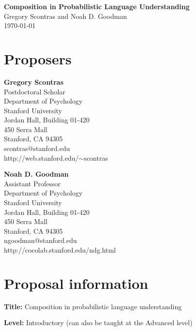 \documentclass[11pt]{article}
\begin{document}
\thispagestyle{plain}

\begin{center}
	
	{\huge \textbf{Composition in Probabilistic Language Understanding}}\\[10pt]
	
	{\Large Gregory Scontras and Noah D. Goodman \\[10pt]
	
	\today}
\end{center}

\section{Proposers}

\begin{minipage}{.5\linewidth}
	\textbf{Gregory Scontras}\\
	Postdoctoral Scholar\\
	Department of Psychology\\
	Stanford University\\
	Jordan Hall, Building 01-420\\
	450 Serra Mall\\
	Stanford, CA 94305\\
	scontras$@$stanford.edu\\
	http://web.stanford.edu/$\sim$scontras
\end{minipage}
\begin{minipage}{.5\linewidth}
	\textbf{Noah D. Goodman}\\
	Assistant Professor\\
	Department of Psychology\\
	Stanford University\\
	Jordan Hall, Building 01-420\\
	450 Serra Mall\\
	Stanford, CA 94305\\
	ngoodman$@$stanford.edu\\
	http://cocolab.stanford.edu/ndg.html
\end{minipage}


\section{Proposal information}
 
\textbf{Title:} Composition in probabilistic language understanding

\textbf{Level:} Introductory (can also be taught at the Advanced level)
\end{document}
